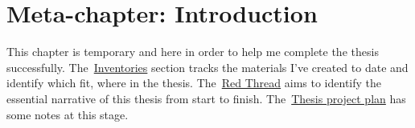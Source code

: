 \section{Meta-chapter: Introduction}
This chapter is temporary and here in order to help me complete the thesis successfully. The~\href{section_inventories}{Inventories} section tracks the materials I've created to date and identify which fit, where in the thesis. The~\href{section_read_thread}{Red Thread} aims to identify the essential narrative of this thesis from start to finish. The~\href{section_thesis_project_plan}{Thesis project plan} has some notes at this stage.
